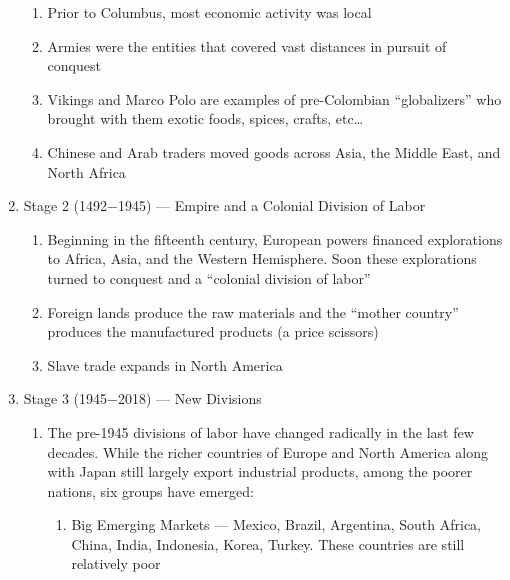 \documentclass[12pt]{article}
\begin{document}
\begin{enumerate}
\begin{enumerate}
          \item Prior to Columbus, most economic activity was local

          \item Armies were the entities that covered vast distances in pursuit of conquest

          \item Vikings and Marco Polo are examples of pre-Colombian “globalizers” who brought with them exotic foods, spices, crafts, etc\dots

          \item Chinese and Arab traders moved goods across Asia, the Middle East, and North Africa

        \end{enumerate}

        \item Stage 2 (1492$-$1945) — Empire and a Colonial Division of Labor

        \begin{enumerate}

          \item Beginning in the fifteenth century, European powers financed explorations to Africa, Asia, and the Western Hemisphere. Soon these explorations turned to conquest and a “colonial division of labor”

          \item Foreign lands produce the raw materials and the “mother country” produces the manufactured products (a price scissors)

          \item Slave trade expands in North America

        \end{enumerate}

      \item Stage 3 (1945$-$2018) — New Divisions

        \begin{enumerate}

          \item The pre-1945 divisions of labor have changed radically in the last few decades. While the richer countries of Europe and North America along with Japan still largely export industrial products, among the poorer nations, six groups have emerged:

            \begin{enumerate}

              \item Big Emerging Markets — Mexico, Brazil, Argentina, South Africa, China, India, Indonesia, Korea, Turkey.  These countries are still relatively poor


\end{enumerate}
\end{enumerate}
\end{enumerate}
\end{document}
